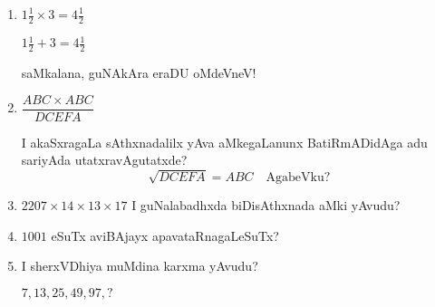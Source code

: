 \begin{enumerate}
\item $1\frac{1}{2}\times 3=4\frac{1}{2}$

$1\frac{1}{2}+3=4\frac{1}{2}$

saMkalana, guNAkAra eraDU oMdeVneV!

\item $\dfrac{ABC\times ABC}{DCEFA}$

I akaSxragaLa sAthxnadalilx yAva aMkegaLanunx BatiRmADidAga adu sariyAda utatxravAgutatxde?
$$
\sqrt{DCEFA}=ABC\quad\text{AgabeVku?}
$$

\item $2207\times 14\times 13\times 17$ I guNalabadhxda biDisAthxnada aMki yAvudu?

\item $1001$ eSuTx aviBAjayx apavataRnagaLeSuTx?

\item I sherxVDhiya muMdina karxma yAvudu?

$7,13,25,49,97,?$

\end{enumerate}
